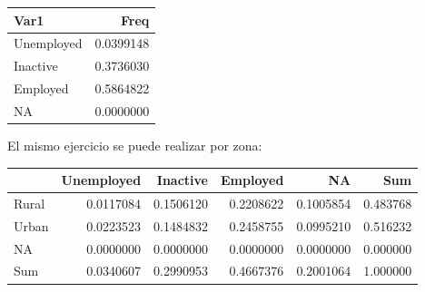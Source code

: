 \documentclass[
  12pt,
]{book}
\newenvironment{Shaded}{\begin{snugshade}}{\end{snugshade}}
\newcommand{\AttributeTok}[1]{\textcolor[rgb]{0.13,0.29,0.53}{#1}}
\newcommand{\FunctionTok}[1]{\textcolor[rgb]{0.13,0.29,0.53}{\textbf{#1}}}
\newcommand{\NormalTok}[1]{#1}
\newcommand{\SpecialCharTok}[1]{\textcolor[rgb]{0.81,0.36,0.00}{\textbf{#1}}}
\newcommand{\StringTok}[1]{\textcolor[rgb]{0.31,0.60,0.02}{#1}}
\begin{document}
\begin{Shaded}
\end{Shaded}

\begin{tabular}{l|r}
\hline
Var1 & Freq\\
\hline
Unemployed & 0.0399148\\
\hline
Inactive & 0.3736030\\
\hline
Employed & 0.5864822\\
\hline
NA & 0.0000000\\
\hline
\end{tabular}

El mismo ejercicio se puede realizar por zona:

\begin{Shaded}
\end{Shaded}

\begin{tabular}{l|r|r|r|r|r}
\hline
  & Unemployed & Inactive & Employed & NA & Sum\\
\hline
Rural & 0.0117084 & 0.1506120 & 0.2208622 & 0.1005854 & 0.483768\\
\hline
Urban & 0.0223523 & 0.1484832 & 0.2458755 & 0.0995210 & 0.516232\\
\hline
NA & 0.0000000 & 0.0000000 & 0.0000000 & 0.0000000 & 0.000000\\
\hline
Sum & 0.0340607 & 0.2990953 & 0.4667376 & 0.2001064 & 1.000000\\
\hline
\end{tabular}

\begin{Shaded}
\end{Shaded}
\end{document}
